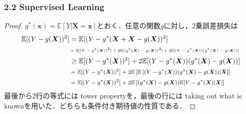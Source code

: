 \documentclass[dvipdfmx,cjk]{beamer}
\theoremstyle{example}
\begin{document}
\begin{frame}
    \frametitle{2.2 Supervised Learning}
    \begin{proof}
        $g^*(\boldsymbol{x}) = \mathbb{E}[Y|\boldsymbol{X}=\boldsymbol{x}]$とおく．任意の関数$g$に対し，2乗誤差損失は
        \begin{align*}
            \mathbb{E}[(Y-g(\boldsymbol{X}))^2] & =\mathbb{E}[(Y-g^*(\boldsymbol{X}+\boldsymbol{X}-g(\boldsymbol{X}))^2]                                                                                                                           \\
                                                & \tiny =\mathbb{E}[(Y-g^*(\boldsymbol{X}))^2]+2\mathbb{E}[(g^*(\boldsymbol{X})-g(\boldsymbol{X}))^2]+2\mathbb{E}[(Y-g^*(\boldsymbol{X}))(g^*(\boldsymbol{X})-g(\boldsymbol{X}))] \normalsize      \\
                                                & \geq \mathbb{E}[(Y-g^*(\boldsymbol{X}))^2] + 2\mathbb{E}[(Y-g^*(\boldsymbol{X}))(g^*(\boldsymbol{X})-g(\boldsymbol{X}))]                                                                         \\
                                                & \footnotesize = \mathbb{E}[(Y-g^*(\boldsymbol{X}))^2] + 2\mathbb{E}\left[\mathbb{E}\left[(Y-g^*(\boldsymbol{X}))(g^*(\boldsymbol{X})-g(\boldsymbol{X}))| \boldsymbol{X}\right]\right]\normalsize \\
                                                & \footnotesize = \mathbb{E}[(Y-g^*(\boldsymbol{X}))^2] + 2\mathbb{E}\left[(g^*(\boldsymbol{X})-g(\boldsymbol{X}))\mathbb{E}[Y-g^*(\boldsymbol{X})|\boldsymbol{X}]\right] \normalsize              \\
        \end{align*}
        最後から2行の等式には tower propertyを，最後の行には taking out what is knownを用いた．どちらも条件付き期待値の性質である．
        \renewcommand{\qedsymbol}{}
    \end{proof}
\end{frame}
\end{document}

